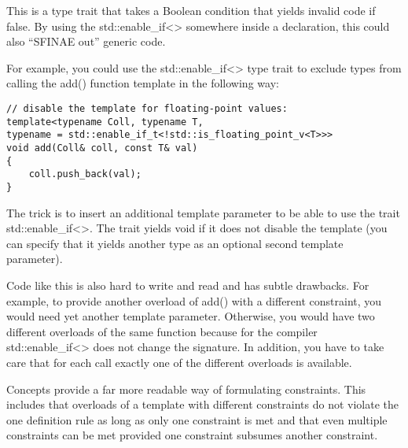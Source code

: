 This is a type trait that takes a Boolean condition that yields invalid code if false. By using the std::enable\_if<> somewhere inside a declaration, this could also “SFINAE out” generic code.

For example, you could use the std::enable\_if<> type trait to exclude types from calling the add() function template in the following way:

\begin{lstlisting}[style=styleCXX]
// disable the template for floating-point values:
template<typename Coll, typename T,
typename = std::enable_if_t<!std::is_floating_point_v<T>>>
void add(Coll& coll, const T& val)
{
	coll.push_back(val);
}
\end{lstlisting}

The trick is to insert an additional template parameter to be able to use the trait std::enable\_if<>. The trait yields void if it does not disable the template (you can specify that it yields another type as an optional second template parameter).

Code like this is also hard to write and read and has subtle drawbacks. For example, to provide another overload of add() with a different constraint, you would need yet another template parameter. Otherwise, you would have two different overloads of the same function because for the compiler std::enable\_if<> does not change the signature. In addition, you have to take care that for each call exactly one of the different overloads is available.

Concepts provide a far more readable way of formulating constraints. This includes that overloads of a template with different constraints do not violate the one definition rule as long as only one constraint is met and that even multiple constraints can be met provided one constraint subsumes another constraint.




